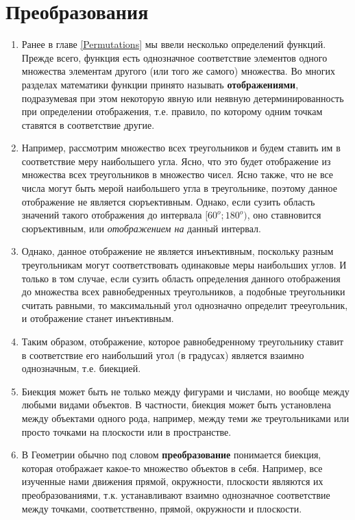\section{Преобразования}


\begin{enumerate}
\item Ранее в главе \ref{Permutations} мы ввели несколько определений функций. Прежде всего, функция есть однозначное соответствие элементов одного множества элементам другого (или того же самого) множества. Во многих разделах математики функции принято называть \textbf{отображениями}, подразумевая при этом некоторую явную или неявную детерминированность при определении отображения, т.е. правило, по которому одним точкам ставятся в соответствие другие.
\item Например, рассмотрим множество всех треугольников и будем ставить им в соответствие меру наибольшего угла. Ясно, что это будет отображение из множества всех треугольников в множество чисел. Ясно также, что не все числа могут быть мерой наибольшего угла в треугольнике, поэтому данное отображение не является сюръективным. Однако, если сузить область значений такого отображения до интервала $[60^o;180^o)$, оно ставновится сюръективным, или \textit{отображением на} данный интервал.
\item Однако, данное отображение не является инъективным, поскольку разным треугольникам могут соответствовать одинаковые меры наибольших углов. И только в том случае, если сузить область определения данного отображения до множества всех равнобедренных треугольников, а подобные треугольники считать равными, то максимальный угол однозначно определит трееугольник, и отображение станет инъективным.
\item Таким образом, отображение, которое равнобедренному треугольнику ставит в соответствие его наибольший угол (в градусах) является взаимно однозначным, т.е. биекцией.
\item Биекция может быть не только между фигурами и числами, но вообще между любыми видами объектов. В частности, биекция может быть установлена между объектами одного рода, например, между теми же треугольниками или просто точками на плоскости или в пространстве.
\item В Геометрии обычно под словом \textbf{преобразование} понимается биекция, которая отображает какое-то множество объектов в себя. Например, все изученные нами движения прямой, окружности, плоскости являются их преобразованиями, т.к. устанавливают взаимно однозначное соответствие между точками, соответственно, прямой, окружности и плоскости.

\end{enumerate}
